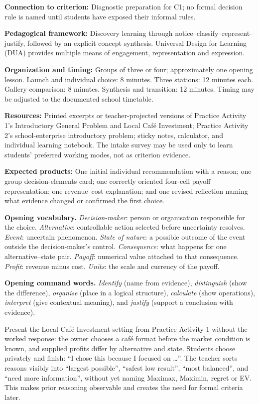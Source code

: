 \documentclass[10pt,letterpaper]{article}
\newcommand{\labelled}[2]{\textbf{#1:} #2\par}
\newcommand{\partheading}[1]{\Needspace{6\baselineskip}\par\vspace{5pt}{\bfseries #1\par}\vspace{1pt}}
\begin{document}
	\vspace{0.20in}
	\begin{bluebox}
		\fontsize{8.65}{10.9}\selectfont
		\partheading{Discovering How We Decide}
		\labelled{Connection to criterion}{Diagnostic preparation for C1; no formal
			decision rule is named until students have exposed their informal rules.}
		\labelled{Pedagogical framework}{Discovery learning through notice--classify--represent--justify, followed by an explicit concept synthesis. Universal Design for Learning (DUA) provides multiple means of engagement, representation and expression.}
		\labelled{Organization and timing}{Groups of three or four; approximately one opening lesson. Launch and individual choice: 8 minutes. Three stations: 12 minutes each. Gallery comparison: 8 minutes. Synthesis and transition: 12 minutes. Timing may be adjusted to the documented school timetable.}
		\labelled{Resources}{Printed excerpts or teacher-projected versions of Practice Activity 1's Introductory General Problem and Local Caf\'e Investment; Practice Activity 2's school-enterprise introductory problem; sticky notes, calculator, and individual learning notebook. The intake survey may be used only to learn students' preferred working modes, not as criterion evidence.}
		\labelled{Expected products}{One initial individual recommendation with a reason; one group decision-elements card; one correctly oriented four-cell payoff representation; one revenue--cost explanation; and one revised reflection naming what evidence changed or confirmed the first choice.}
		
		\textbf{Opening vocabulary.} \emph{Decision-maker}: person or organisation
		responsible for the choice. \emph{Alternative}: controllable action selected
		before uncertainty resolves. \emph{Event}: uncertain phenomenon. \emph{State
			of nature}: a possible outcome of the event outside the decision-maker's
		control. \emph{Consequence}: what happens for one alternative--state pair.
		\emph{Payoff}: numerical value attached to that consequence. \emph{Profit}:
		revenue minus cost. \emph{Units}: the scale and currency of the payoff.
		
		\textbf{Opening command words.} \emph{Identify} (name from evidence),
		\emph{distinguish} (show the difference), \emph{organise} (place in a logical
		structure), \emph{calculate} (show operations), \emph{interpret} (give
		contextual meaning), and \emph{justify} (support a conclusion with evidence).
		
		\partheading{Launch---an unrevealed decision rule}
		Present the Local Caf\'e Investment setting from Practice Activity 1 without
		the worked response: the owner chooses a caf\'e format before the market
		condition is known, and supplied profits differ by alternative and state.
		Students choose privately and finish: ``I chose this because I focused on
		\ldots''. The teacher sorts reasons visibly into ``largest possible'', ``safest
		low result'', ``most balanced'', and ``need more information'', without yet
		naming Maximax, Maximin, regret or EV. This makes prior reasoning observable
		and creates the need for formal criteria later.
		

\end{bluebox}
\end{document}
